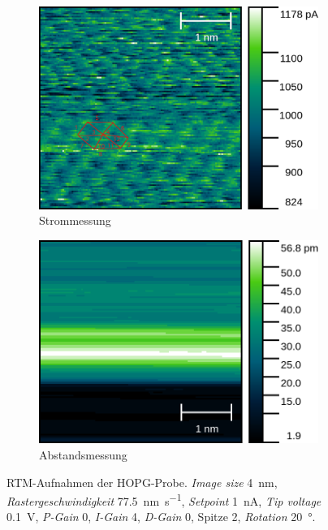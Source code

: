 \begin{figure}
	\centering
	\begin{subfigure}{0.45\linewidth}
		\centering
		\includegraphics[width=\linewidth]{figs/HOPG10597_lines.png}
		\caption{Strommessung}
		\label{fig:hopg_rtm_4nm_1_cur}
	\end{subfigure}
	\hspace{.5cm}
	\begin{subfigure}{0.45\linewidth}
		\centering
		\includegraphics[width=\linewidth]{figs/HOPG10597_height.png}
		\caption{Abstandsmessung}
		\label{fig:hopg_rtm_4nm_1_height}
	\end{subfigure}
	\caption{RTM-Aufnahmen der HOPG-Probe. \textit{Image size} \SI{4}{\nano \meter},
	\textit{Rastergeschwindigkeit} \SI{77.5}{\nm\per \second}, \textit{Setpoint} \SI{1}{\nano \ampere},
	\textit{Tip voltage} \SI{0.1}{\volt}, \textit{P-Gain} \num{0}, \textit{I-Gain} \num{4},
	\textit{D-Gain} \num{0}, Spitze 2, \textit{Rotation} \SI{20}{\degree}.}
	\label{fig:hopg_rtm_1}
\end{figure}
